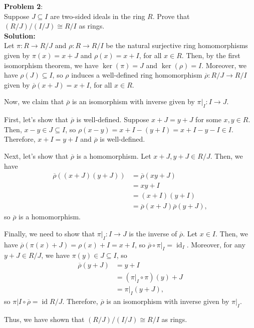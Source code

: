 \documentclass[11pt]{article}
\newcommand{\prob}[3]{\begin{flushleft}
        \textbf{Problem #1}: \\
        #2 
		\textbf{Solution:} 
		#3

\end{flushleft}}
\begin{document}
\prob{2}{
Suppose $J \subseteq I$ are two-sided ideals in the ring $R$. Prove that $(R/J)/(I/J) \cong R/I$ as rings. \\
}{ \\
Let $\pi: R\rightarrow R/J$ and $\rho: R\rightarrow R/I$ be the natural surjective ring homomorphisms given by $\pi(x)=x+J$ and $\rho(x)=x+I$, for all $x\in R$. Then, by the first isomorphism theorem, we have $\operatorname{ker}(\pi)=J$ and $\operatorname{ker}(\rho)=I$. Moreover, we have $\rho(J)\subseteq I$, so $\rho$ induces a well-defined ring homomorphism $\overline{\rho}:R/J\rightarrow R/I$ given by $\overline{\rho}(x+J)=x+I$, for all $x\in R$.

Now, we claim that $\overline{\rho}$ is an isomorphism with inverse given by $\pi|_{I}: I\rightarrow J$.

First, let's show that $\overline{\rho}$ is well-defined. Suppose $x+J=y+J$ for some $x,y\in R$. Then, $x-y\in J\subseteq I$, so $\rho(x-y)=x+I-(y+I)=x+I-y-I\in I$. Therefore, $x+I=y+I$ and $\overline{\rho}$ is well-defined.

Next, let's show that $\overline{\rho}$ is a homomorphism. Let $x+J,y+J\in R/J$. Then, we have
\begin{align*}
    \overline{\rho}((x+J)(y+J)) & =\overline{\rho}(xy+J)                     \\
                                & =xy+I                                      \\
                                & =(x+I)(y+I)                                \\
                                & =\overline{\rho}(x+J)\overline{\rho}(y+J),
\end{align*}
so $\overline{\rho}$ is a homomorphism.

Finally, we need to show that $\pi|_I: I\rightarrow J$ is the inverse of $\overline{\rho}$. Let $x\in I$. Then, we have $\overline{\rho}(\pi(x)+J)=\rho(x)+I=x+I$, so $\overline{\rho}\circ\pi|_I=\operatorname{id}_I$. Moreover, for any $y+J\in R/J$, we have $\pi(y)\in J\subseteq I$, so
\begin{align*}
    \overline{\rho}(y+J) & =y+I                   \\
                         & =(\pi|_I\circ\pi)(y)+J \\
                         & =\pi|_I(y+J),
\end{align*}
so $\pi|I\circ\overline{\rho}=\operatorname{id}{R/J}$. Therefore, $\overline{\rho}$ is an isomorphism with inverse given by $\pi|_I$.

Thus, we have shown that $(R/J)/(I/J)\cong R/I$ as rings.
}
\end{document}
